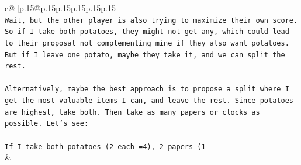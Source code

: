 \documentclass{article}
\begin{document}
{\begin{supertabular}{c@{$\;$}|p{.15\linewidth}@{}p{.15\linewidth}p{.15\linewidth}p{.15\linewidth}p{.15\linewidth}p{.15\linewidth}}
{{{\\ 
\texttt{Wait, but the other player is also trying to maximize their own score. So if I take both potatoes, they might not get any, which could lead to their proposal not complementing mine if they also want potatoes. But if I leave one potato, maybe they take it, and we can split the rest.} \\
\\ 
\texttt{Alternatively, maybe the best approach is to propose a split where I get the most valuable items I can, and leave the rest. Since potatoes are highest, take both. Then take as many papers or clocks as possible. Let's see:} \\
\\ 
\texttt{If I take both potatoes (2 each =4), 2 papers (1} \\
            }
        }
    }
    & \\ \\


\end{supertabular}}
\end{document}
